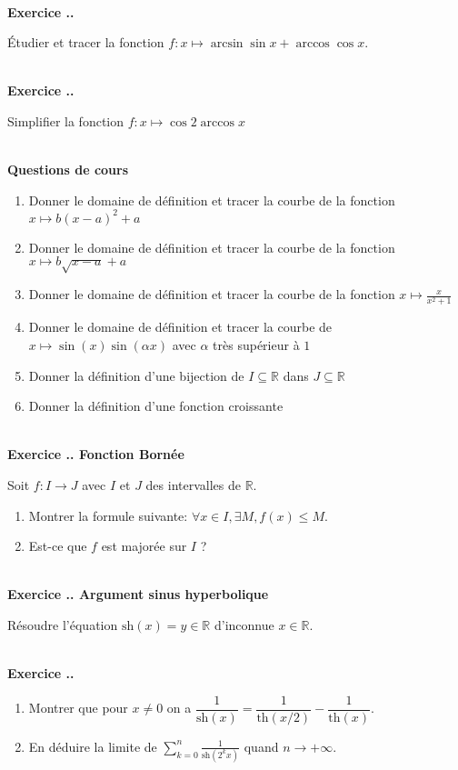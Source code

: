 \documentclass{article}
\newcommand{\ds}{\vspace{0.4\baselineskip}}
\newcommand{\mb}[1]{\mathbb{#1}}
\newcounter{exo}
\newcommand{\exercice}[1][\null]{\textbf{\\ Exercice \thesection.\theexo. #1} \addtocounter{exo}{1}}
\newcommand{\cours}{\textbf{\ds \\ \large Questions de cours}}
\begin{document}
\exercice 

Étudier et tracer la fonction $f : x \mapsto \arcsin \sin x + \arccos \cos x$.

\exercice 

Simplifier la fonction $f : x \mapsto \cos 2 \arccos x$




\cours 

\begin{enumerate}
    \item Donner le domaine de définition et tracer 
        la courbe de la fonction $x \mapsto b (x - a)^2 + a$

    \item Donner le domaine de définition et tracer 
        la courbe de la fonction $x \mapsto b \sqrt{x - a} + a$

    \item Donner le domaine de définition et tracer 
        la courbe de la fonction $x \mapsto \frac{x}{x^2 + 1}$


    \item Donner le domaine de définition et tracer la courbe 
        de $x \mapsto \sin(x) \sin (\alpha x)$ avec $\alpha$ très
        supérieur à $1$

    \item Donner la définition d'une bijection de $I \subseteq \mb{R}$
        dans $J \subseteq \mb{R}$

    \item Donner la définition d'une fonction croissante 
\end{enumerate}

\exercice[Fonction Bornée]

Soit $f : I \to J$ avec $I$ et $J$ des intervalles de $\mb{R}$.

\begin{enumerate}
    \item Montrer la formule suivante: $\forall x \in I, \exists M, f(x) \leq
        M$.

    \item Est-ce que $f$ est majorée sur $I$ ?
\end{enumerate}


\exercice[Argument sinus hyperbolique]

Résoudre l'équation $\text{sh}(x) =y \in \mb{R}$ d'inconnue $x \in \mb{R}$.


\exercice

\begin{enumerate}

\item Montrer que pour $x \neq 0$ on a $\dfrac{1}{\text{sh}(x)} = \dfrac{1}{\text{th}(x/2)} - \dfrac{1}{\text{th}(x)}$.


\item En déduire la limite de $\displaystyle \sum_{k=0}^n \frac{1}{\text{sh}(2^kx)}$ quand $n \rightarrow + \infty$.

\end{enumerate}
\end{document}

